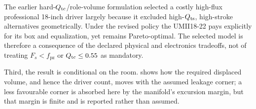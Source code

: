 The earlier hard-$Q_{\mathrm{tc}}$/role-volume formulation selected a costly
high-flux professional 18-inch driver largely because it excluded
high-$Q_{\mathrm{ts}}$, high-stroke alternatives geometrically. Under the revised
policy the UMII18-22 pays explicitly for its box and equalization, yet
remains Pareto-optimal. The selected model is therefore a consequence of
the declared physical and electronics tradeoffs, not of treating
$F_s< f_{\mathrm{pz}}$ or $Q_{\mathrm{tc}}\le0.55$ as mandatory.

Third, the result is conditional on the room. 
shows how the required displaced volume, and hence the driver count, moves
with the assumed leakage corner; a less favourable corner is absorbed here
by the manifold's excursion margin, but that margin is finite and is
reported rather than assumed.
